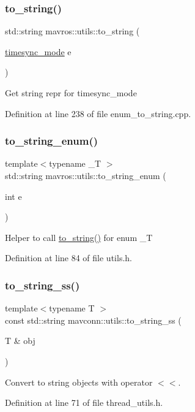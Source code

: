 \mbox{\label{group__mavutils_gac86aed43baa119369cb7eb523c7de067}} 
\subsubsection{\texorpdfstring{to\_string()}{to\_string()}\hspace{0.1cm}{\footnotesize\ttfamily [11/11]}}
{\footnotesize\ttfamily std\+::string mavros\+::utils\+::to\+\_\+string (\begin{DoxyParamCaption}\item[{\mbox{\hyperlink{group__mavutils_gac7f53712a7627f397d0eb145c2a16cf7}{timesync\+\_\+mode}}}]{e }\end{DoxyParamCaption})}

Get string repr for timesync\+\_\+mode 

Definition at line 238 of file enum\+\_\+to\+\_\+string.\+cpp.

\mbox{\label{group__mavutils_ga80987ce0a2019df54e1fe62b7b53de7f}} 
\subsubsection{\texorpdfstring{to\_string\_enum()}{to\_string\_enum()}}
{\footnotesize\ttfamily template$<$typename \+\_\+T $>$ \\
std\+::string mavros\+::utils\+::to\+\_\+string\+\_\+enum (\begin{DoxyParamCaption}\item[{int}]{e }\end{DoxyParamCaption})}

Helper to call \mbox{\hyperlink{group__mavutils_gac86aed43baa119369cb7eb523c7de067}{to\+\_\+string()}} for enum \+\_\+T 

Definition at line 84 of file utils.\+h.

\mbox{\label{group__mavutils_ga6c132876dd85249684a7935fe0bc8f51}} 
\subsubsection{\texorpdfstring{to\_string\_ss()}{to\_string\_ss()}}
{\footnotesize\ttfamily template$<$typename T $>$ \\
const std\+::string mavconn\+::utils\+::to\+\_\+string\+\_\+ss (\begin{DoxyParamCaption}\item[{T \&}]{obj }\end{DoxyParamCaption})\hspace{0.3cm}{\ttfamily [inline]}}



Convert to string objects with operator $<$$<$. 



Definition at line 71 of file thread\+\_\+utils.\+h.

